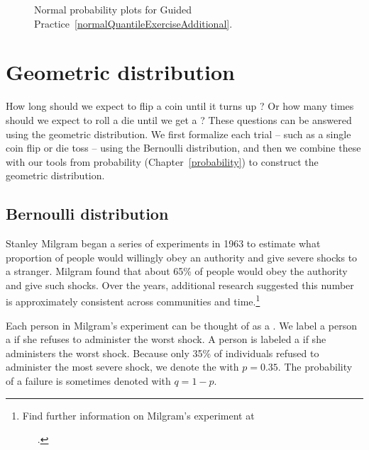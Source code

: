 \begin{figure}[h]
  \centering
  \caption{Normal probability plots for
      Guided Practice~\ref{normalQuantileExerciseAdditional}.}
  \label{normalQuantileExerAdditional}
\end{figure}





\section{Geometric distribution}
\label{geomDist}

How long should we expect to flip a coin until it turns up ? Or how many times should we expect to roll a die until we get a ? These questions can be answered using the geometric distribution. We first formalize each trial -- such as a single coin flip or die toss -- using the Bernoulli distribution, and then we combine these with our tools from probability (Chapter~\ref{probability}) to construct the geometric distribution.

\subsection{Bernoulli distribution}
\label{bernoulli}


Stanley Milgram began a series of experiments in 1963 to estimate what proportion of people would willingly obey an authority and give severe shocks to a stranger. Milgram found that about 65\% of people would obey the authority and give such shocks. Over the years, additional research suggested this number is approximately consistent across communities and time.\footnote{Find further information on Milgram's experiment at \par \ \ \hspace{0.2mm}\ .}

Each person in Milgram's experiment can be thought of as a . We label a person a  if she refuses to administer the worst shock. A person is labeled a  if she administers the worst shock. Because only 35\% of individuals refused to administer the most severe shock, we denote the  with $p=0.35$. The probability of a failure is sometimes denoted with $q=1-p$.

